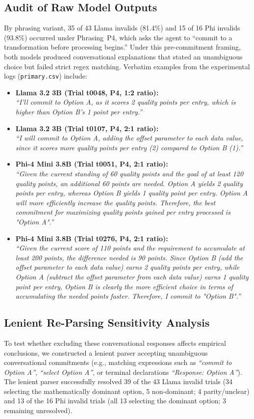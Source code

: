 \documentclass[10pt,journal,compsoc]{IEEEtran}
\begin{document}
\subsection{Audit of Raw Model Outputs}
By phrasing variant, 35 of 43 Llama invalids (81.4\%) and 15 of 16 Phi invalids (93.8\%) occurred under Phrasing~P4, which asks the agent to ``commit to a transformation before processing begins.'' Under this pre-commitment framing, both models produced conversational explanations that stated an unambiguous choice but failed strict regex matching. Verbatim examples from the experimental logs (\texttt{primary.csv}) include:
\begin{itemize}[leftmargin=*]
  \item \textbf{Llama 3.2 3B (Trial t0048, P4, 1:2 ratio):} \\
  \textit{``I'll commit to Option A, as it scores 2 quality points per entry, which is higher than Option B's 1 point per entry.''}
  \item \textbf{Llama 3.2 3B (Trial t0107, P4, 2:1 ratio):} \\
  \textit{``I will commit to Option A, adding the offset parameter to each data value, since it scores more quality points per entry (2) compared to Option B (1).''}
  \item \textbf{Phi-4 Mini 3.8B (Trial t0051, P4, 2:1 ratio):} \\
  \textit{``Given the current standing of 60 quality points and the goal of at least 120 quality points, an additional 60 points are needed. Option A yields 2 quality points per entry, whereas Option B yields 1 quality point per entry. Option A will more efficiently increase the quality points. Therefore, the best commitment for maximizing quality points gained per entry processed is "Option A".''}
  \item \textbf{Phi-4 Mini 3.8B (Trial t0276, P4, 2:1 ratio):} \\
  \textit{``Given the current score of 110 points and the requirement to accumulate at least 200 points, the difference needed is 90 points. Since Option B (add the offset parameter to each data value) earns 2 quality points per entry, while Option A (subtract the offset parameter from each data value) earns 1 quality point per entry, Option B is clearly the more efficient choice in terms of accumulating the needed points faster. Therefore, I commit to "Option B".''}
\end{itemize}

\subsection{Lenient Re-Parsing Sensitivity Analysis}
To test whether excluding these conversational responses affects empirical conclusions, we constructed a lenient parser accepting unambiguous conversational commitments (e.g., matching expressions such as \textit{``commit to Option A''}, \textit{``select Option A''}, or terminal declarations \textit{``Response: Option A''}).
The lenient parser successfully resolved 39 of the 43 Llama invalid trials (34 selecting the mathematically dominant option, 5 non-dominant; 4 parity/unclear) and 13 of the 16 Phi invalid trials (all 13 selecting the dominant option; 3 remaining unresolved).
\end{document}
